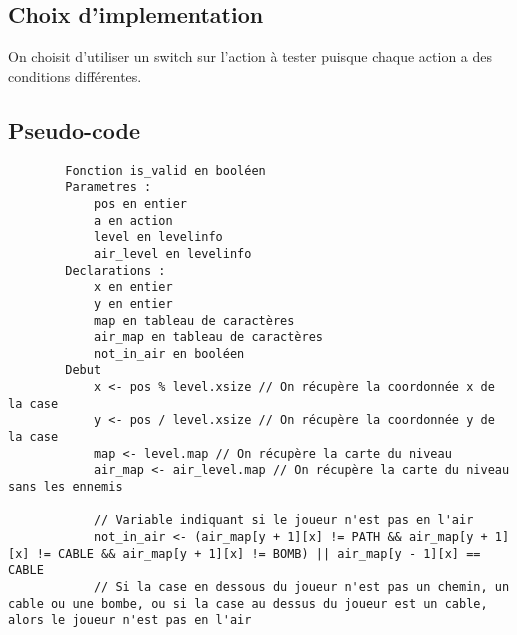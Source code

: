 \subsection{Choix d'implementation}

On choisit d'utiliser un switch sur l'action à tester puisque chaque action a des conditions différentes.

\subsection{Pseudo-code}

\begin{longlisting}
    \begin{verbatim}
        Fonction is_valid en booléen
        Parametres :
            pos en entier
            a en action
            level en levelinfo
            air_level en levelinfo
        Declarations :
            x en entier
            y en entier
            map en tableau de caractères
            air_map en tableau de caractères
            not_in_air en booléen
        Debut
            x <- pos % level.xsize // On récupère la coordonnée x de la case
            y <- pos / level.xsize // On récupère la coordonnée y de la case
            map <- level.map // On récupère la carte du niveau
            air_map <- air_level.map // On récupère la carte du niveau sans les ennemis

            // Variable indiquant si le joueur n'est pas en l'air
            not_in_air <- (air_map[y + 1][x] != PATH && air_map[y + 1][x] != CABLE && air_map[y + 1][x] != BOMB) || air_map[y - 1][x] == CABLE
            // Si la case en dessous du joueur n'est pas un chemin, un cable ou une bombe, ou si la case au dessus du joueur est un cable, alors le joueur n'est pas en l'air


\end{verbatim}
\end{longlisting}
